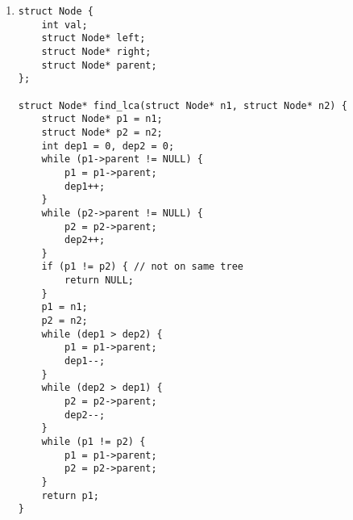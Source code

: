\documentclass{article}
\begin{document}
\begin{enumerate}
\begin{lstlisting}
    list_insert(x, ht->buckets[hsh]);  
    ht->size++;

    return true;
}

bool table_search(const void* x, struct hashtable* ht) {
    assert(x);
    assert(ht);
    int hsh = ht->hash_func(x);
    struct List* l = ht->buckets[hsh];
    struct Node* ptr = l->front;
    while (ptr) {
        if (ht->key_cmp(x, ptr->val) == 0) {
            return true;
        }
        ptr = ptr->nxt;
    }
    return false;
}

bool table_remove(const void* x, struct hashtable* ht) {
    int hsh = ht->hash_func(x);
    struct List* l = ht->buckets[hsh];
    if (ht->key_cmp(l->front->val, x) == 0) { // remove from head
        struct Node* tmp = l->front;
        l->front = l->front->nxt;
        ht->size--;
        free(tmp); // must free
    }
    struct Node* ptr = l->front;
    struct Node* prev = NULL;
    while (ptr) {
        if (ht->key_cmp(x, ptr->val) == 0) {
            prev->nxt = ptr->nxt;
            free(ptr);
            ht->size--;
            return true;
        }
        prev = ptr;
        ptr = ptr->nxt;
    }
    return false;
}

void table_print(struct hashtable* ht) {
    for (int i = 0; i < ht->bucket_length; i++) {
        struct List* lst = ht->buckets[i];
        if (lst->front == NULL) {
            printf("EMPTY Bucket\n");
            continue;
        }
        struct Node* p = 
lst->front;
        while (p) {
            ht->key_print(p->val);
            p = p->nxt;
        }
        printf("\n");
    }
}


    \end{lstlisting}

    \newpage
    \item 
    \begin{lstlisting}
struct Node {
    int val;
    struct Node* left;
    struct Node* right;
    struct Node* parent;
};

struct Node* find_lca(struct Node* n1, struct Node* n2) {
    struct Node* p1 = n1;
    struct Node* p2 = n2;
    int dep1 = 0, dep2 = 0;
    while (p1->parent != NULL) {
        p1 = p1->parent;
        dep1++;
    }
    while (p2->parent != NULL) {
        p2 = p2->parent;
        dep2++;
    }
    if (p1 != p2) { // not on same tree
        return NULL;
    }
    p1 = n1;
    p2 = n2;
    while (dep1 > dep2) {
        p1 = p1->parent;
        dep1--;
    }
    while (dep2 > dep1) {
        p2 = p2->parent;
        dep2--;
    }
    while (p1 != p2) {
        p1 = p1->parent;
        p2 = p2->parent;
    }
    return p1;
}



\end{lstlisting}
\end{enumerate}
\end{document}
